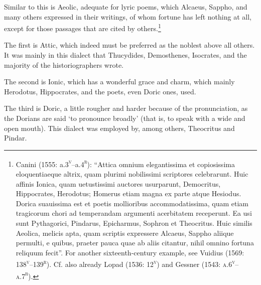 \begin{styleQuote}
Similar to this is Aeolic, adequate for lyric poems, which Alcaeus, Sappho, and many others expressed in their writings, of whom fortune has left nothing at all, except for those passages that are cited by others.\footnote{ Canini (1555: a.3\textsc{\textsuperscript{v}}–a.4\textsc{\textsuperscript{r}}): “Attica omnium elegantissima et copiosissima eloquentiaeque altrix, quam plurimi nobilissimi scriptores celebrarunt. Huic affinis Ionica, quam uetustissimi auctores usurparunt, Democritus, Hippocrates, Herodotus; Homerus etiam magna ex parte atque Hesiodus. Dorica suauissima est et poetis mollioribus accommodatissima, quam etiam tragicorum chori ad temperandam argumenti acerbitatem receperunt. Ea usi sunt Pythagorici, Pindarus, Epicharmus, Sophron et Theocritus. Huic similis Aeolica, melicis apta, quam scriptis expressere Alcaeus, Sappho aliique permulti, e quibus, praeter pauca quae ab aliis citantur, nihil omnino fortuna reliquum fecit”. For another sixteenth-century example, see Vuidius (1569: 138\textsc{\textsuperscript{v}}–139\textsc{\textsuperscript{r}}). Cf. also already Lopad (1536: 12\textsc{\textsuperscript{v}}) and Gessner (1543: \textsc{a.6}\textsc{\textsuperscript{v}}\textsc{–a.7}\textsc{\textsuperscript{r}}).}
\end{styleQuote}

\begin{styleQuote}
The first is Attic, which indeed must be preferred as the noblest above all others. It was mainly in this dialect that Thucydides, Demosthenes, Isocrates, and the majority of the historiographers wrote.
\end{styleQuote}

\begin{styleQuote}
The second is Ionic, which has a wonderful grace and charm, which mainly Herodotus, Hippocrates, and the poets, even Doric ones, used.
\end{styleQuote}

\begin{styleQuote}
The third is Doric, a little rougher and harder because of the pronunciation, as the Dorians are said ‘to pronounce broadly’ (that is, to speak with a wide and open mouth). This dialect was employed by, among others, Theocritus and Pindar.
\end{styleQuote}

